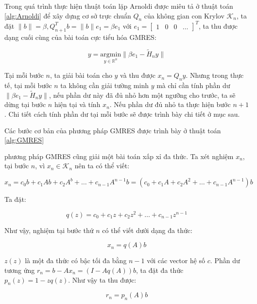\documentclass[14pt, a4paper]{article}
\numberwithin{equation}{section}
\numberwithin{algorithm}{section}
\numberwithin{figure}{section}
\numberwithin{dl}{section}
\numberwithin{md}{section}
\numberwithin{bd}{section}
\numberwithin{dn}{section}
\begin{document}
Trong quá trình thực hiện thuật toán lặp Arnoldi được miêu tả ở thuật toán \ref{alg:Arnoldi} để xây dựng cơ sở trực chuẩn $Q_n$ của không gian con Krylov $\mathcal{K}_n$, ta đặt $\lVert b \rVert = \beta, Q_{n+1}^T b=\lVert b \rVert e_1=\beta e_1$ với $e_1 = \begin{bmatrix}
    1 & 0 & 0 & \dots
\end{bmatrix}^T$, ta thu được dạng cuối cùng của bài toán cực tiểu hóa GMRES:

\begin{equation}
    y = \underset{y \in \mathbb{R}^{n}}{\mathrm{argmin}} \lVert \beta e_1 - \widetilde{H}_n y \rVert
\end{equation}

Tại mỗi bước $n$, ta giải bài toán cho $y$ và thu được $x_n = Q_n y$. Nhưng trong thực tế, tại mỗi bước $n$ ta không cần giải tường minh $y$ mà chỉ cần tính phần dư $\lVert \beta e_1 - \widetilde{H}_n y \rVert$, nếu phần dư này đã đủ nhỏ hơn một ngưỡng cho trước, ta sẽ dừng tại bước $n$ hiện tại và tính $x_n$. Nếu phần dư đủ nhỏ ta thực hiện bước $n+1$. Chi tiết cách tính phần dư tại mỗi bước sẽ được trình bày chi tiết ở mục sau.

Các bước cơ bản của phương pháp GMRES được trình bày ở thuật toán \ref{alg:GMRES}

phương pháp GMRES cũng giải một bài toán xấp xỉ đa thức. Ta xét nghiệm $x_n$, tại bước $n$, vì $x_n \in \mathcal{K}_n$ nên ta có thể viết:

\begin{equation}
    x_n = c_0 b + c_1 A b + c_2 A^b + \dots + c_{n-1}A^{n-1}b=(c_0 + c_1 A + c_2 A^2 + \dots + c_{n-1} A^{n-1})b
\end{equation}

Ta đặt:

\begin{equation}
    q(z) = c_0 + c_1 z + c_2 z^2 + \dots + c_{n-1}z^{n-1}
\end{equation}

Như vậy, nghiệm tại bước thứ $n$ có thể viết dưới dạng đa thức:

\begin{equation}
    x_n = q(A)b
\end{equation}

$z(z)$ là một đa thức có bậc tối đa bằng $n-1$ với các vector hệ số $c$. Phần dư tương ứng $r_n=b - Ax_n=(I - Aq(A))b$, ta đặt đa thức $p_n(z) = 1 - z q(z)$. Như vậy ta thu được:

\begin{equation} \label{eq:Polynomial-Approximation}
    r_n = p_n(A)b
\end{equation}
\end{document}
